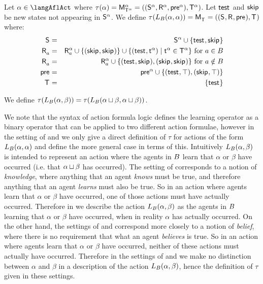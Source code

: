 \begin{definition}[Learning]\label{afl-k-learning}
Let $\alpha \in \langAflAct$ where $\tau(\alpha) = \aPModel[\alpha]{\aStatesT[\alpha]} = \aPModelTuple[\alpha]{\aStatesT[\alpha]}$.
Let $\aStateTest$ and $\aStateSkip$ be new states not appearing in $\aStates[\alpha]$.
We define $\tau(\learns_\agentsB (\alpha, \alpha)) = \aPModel{\aStatesT} = \aPModelTuple{\aStatesT}$ where:
\begin{eqnarray*}
    \aStates &=& \aStates[\alpha] \cup \{\aStateTest, \aStateSkip\}\\
    \aAccessibility{\agentA} &=& \aAccessibility[\alpha]{\agentA} \cup \{(\aStateSkip, \aStateSkip)\} \cup \{(\aStateTest, \aStateT[\alpha]) \mid \aStateT[\alpha] \in \aStatesT[\alpha]\} \text{ for } \agentA \in \agentsB\\
    \aAccessibility{\agentA} &=& \aAccessibility[\alpha]{\agentA} \cup \{(\aStateTest, \aStateSkip), (\aStateSkip, \aStateSkip)\} \text{ for } \agentA \notin \agentsB\\
    \aPrecondition &=& \aPrecondition[\alpha] \cup \{(\aStateTest, \top), (\aStateSkip, \top)\}\\
    \aStatesT &=& \{\aStateTest\}
\end{eqnarray*}

We define $\tau(\learns_\agentsB (\alpha, \beta)) = \tau(\learns_\agentsB (\alpha \choice \beta, \alpha \choice \beta))$.
\end{definition}

We note that the syntax of action formula logic defines the learning operator as a binary operator that can be applied to two different action formulae, however in the setting of \classK{} and \classKFF{} we only give a direct definition of $\tau$ for actions of the form $\learns_\agentsB (\alpha, \alpha)$ and define the more general case in terms of this.
Intuitively $\learns_\agentsB (\alpha, \beta)$ is intended to represent an action where the agents in $\agentsB$ learn that $\alpha$ or $\beta$ have occurred (i.e. that $\alpha \choice \beta$ has occurred).
The setting of \classS{} corresponds to a notion of {\em knowledge}, where anything that an agent {\em knows} must be true, and therefore anything that an agent {\em learns} must also be true.
So in an action where agents learn that $\alpha$ or $\beta$ have occurred, one of those actions must have actually occurred.
Therefore in \classS{} we describe the action $\learns_\agentsB (\alpha, \beta)$ as the agents in $\agentsB$ learning that $\alpha$ or $\beta$ have occurred, when in reality $\alpha$ has actually occurred.
On the other hand, the settings of \classK{} and \classKFF{} correspond more closely to a notion of {\em belief}, where there is no requirement that what an agent {\em believes} is true.
So in an action where agents learn that $\alpha$ or $\beta$ have occurred, neither of these actions must actually have occurred.
Therefore in the settings of \classK{} and \classKFF{} we make no distinction between $\alpha$ and $\beta$ in a description of the action $\learns_\agentsB (\alpha, \beta)$, hence the definition of $\tau$ given in these settings.

